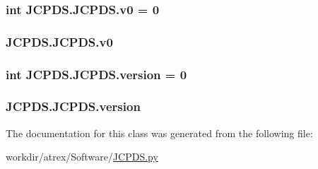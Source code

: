 \hypertarget{class_j_c_p_d_s_1_1_j_c_p_d_s_aaef6e23360b1e68d8cfdcad1c60fb88f}{
\subsubsection[{v0}]{\setlength{\rightskip}{0pt plus 5cm}int J\-C\-P\-D\-S.\-J\-C\-P\-D\-S.\-v0 = 0\hspace{0.3cm}{\ttfamily [static]}}}\label{class_j_c_p_d_s_1_1_j_c_p_d_s_aaef6e23360b1e68d8cfdcad1c60fb88f}
\hypertarget{class_j_c_p_d_s_1_1_j_c_p_d_s_aef3a4e5b9b3659dc953d276e53a12743}{
\subsubsection[{v0}]{\setlength{\rightskip}{0pt plus 5cm}J\-C\-P\-D\-S.\-J\-C\-P\-D\-S.\-v0}}\label{class_j_c_p_d_s_1_1_j_c_p_d_s_aef3a4e5b9b3659dc953d276e53a12743}
\hypertarget{class_j_c_p_d_s_1_1_j_c_p_d_s_a16bc3288893c02b04d91bd8a3fa315fe}{
\subsubsection[{version}]{\setlength{\rightskip}{0pt plus 5cm}int J\-C\-P\-D\-S.\-J\-C\-P\-D\-S.\-version = 0\hspace{0.3cm}{\ttfamily [static]}}}\label{class_j_c_p_d_s_1_1_j_c_p_d_s_a16bc3288893c02b04d91bd8a3fa315fe}
\hypertarget{class_j_c_p_d_s_1_1_j_c_p_d_s_af32006e867dad5c863a396af1590c34f}{
\subsubsection[{version}]{\setlength{\rightskip}{0pt plus 5cm}J\-C\-P\-D\-S.\-J\-C\-P\-D\-S.\-version}}\label{class_j_c_p_d_s_1_1_j_c_p_d_s_af32006e867dad5c863a396af1590c34f}


The documentation for this class was generated from the following file\-:\begin{DoxyCompactItemize}
\item 
workdir/atrex/\-Software/\hyperlink{_j_c_p_d_s_8py}{J\-C\-P\-D\-S.\-py}\end{DoxyCompactItemize}
